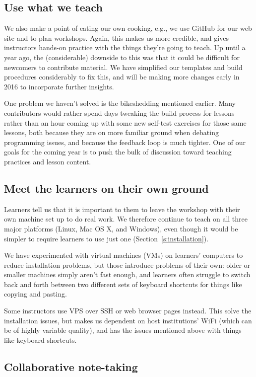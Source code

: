 \documentclass[10pt,a4paper,twocolumn]{article}
\begin{document}
\subsection{Use what we teach}

We also make a point of eating our own cooking, e.g., we use GitHub
for our web site and to plan workshops. Again, this makes us more
credible, and gives instructors hands-on practice with the things
they're going to teach.  Up until a year ago, the (considerable)
downside to this was that it could be difficult for newcomers to
contribute material.  We have simplified our templates and build
procedures considerably to fix this, and will be making more changes
early in 2016 to incorporate further insights.

One problem we haven't solved is the bikeshedding mentioned earlier.
Many contributors would rather spend days tweaking the build process
for lessons rather than an hour coming up with some new self-test
exercises for those same lessons, both because they are on more
familiar ground when debating programming issues, and because the
feedback loop is much tighter.  One of our goals for the coming year
is to push the bulk of discussion toward teaching practices and lesson
content.

\subsection{Meet the learners on their own ground}

Learners tell us that it is important to them to leave the workshop
with their own machine set up to do real work.  We therefore continue
to teach on all three major platforms (Linux, Mac OS X, and Windows),
even though it would be simpler to require learners to use just one
(Section~\ref{s:installation}).

We have experimented with virtual machines (VMs) on learners'
computers to reduce installation problems, but those introduce
problems of their own: older or smaller machines simply aren't fast
enough, and learners often struggle to switch back and forth between
two different sets of keyboard shortcuts for things like copying and
pasting.

Some instructors use VPS over SSH or web browser pages instead.  This
solve the installation issues, but makes us dependent on host
institutions' WiFi (which can be of highly variable quality), and
has the issues mentioned above with things like keyboard shortcuts.

\subsection{Collaborative note-taking}\label{s:etherpad}
\end{document}
